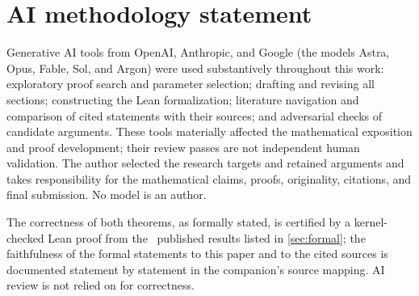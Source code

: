 \documentclass[11pt,letterpaper]{article}
\theoremstyle{definition}
\theoremstyle{remark}
\begin{document}
\clearpage




\clearpage

\section*{AI methodology statement}
Generative AI tools from OpenAI, Anthropic, and Google (the models Astra, Opus, Fable, Sol, and Argon) were used
substantively throughout this work: exploratory proof search and
parameter selection; drafting and revising all sections; constructing the Lean formalization; literature
navigation and comparison of cited statements with their sources; and
adversarial checks of candidate arguments.
These tools materially affected the mathematical exposition and proof
development; their review passes are not independent human validation.
The author selected the research targets and retained arguments and
takes responsibility for the mathematical claims, proofs, originality,
citations, and final submission. No model is an author.

The correctness of both theorems, as formally stated, is certified by a kernel-checked Lean proof from the \publishedinputcount\ published results listed in \cref{sec:formal}; the faithfulness of the formal statements to this paper and to the cited sources is documented statement by statement in the companion's source mapping. AI review is not relied on for correctness.
\end{document}
